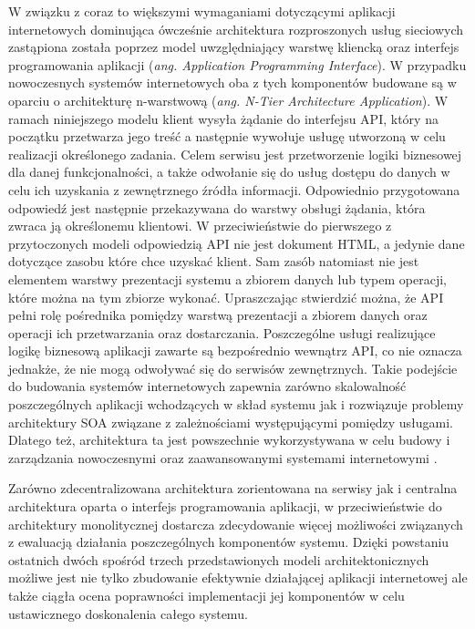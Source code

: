 W związku z coraz to większymi wymaganiami dotyczącymi aplikacji internetowych dominująca ówcześnie architektura rozproszonych usług sieciowych zastąpiona została poprzez model uwzględniający warstwę kliencką oraz interfejs programowania aplikacji (\textit{ang. Application Programming Interface}). W przypadku nowoczesnych systemów internetowych oba z tych komponentów budowane są w oparciu o architekturę n-warstwową (\textit{ang. N-Tier Architecture Application}). W ramach niniejszego modelu klient wysyła żądanie do interfejsu API, który na początku przetwarza jego treść a następnie wywołuje usługę utworzoną w celu realizacji określonego zadania. Celem serwisu jest przetworzenie logiki biznesowej dla danej funkcjonalności, a także odwołanie się do usług dostępu do danych w celu ich uzyskania z zewnętrznego źródła informacji. Odpowiednio przygotowana odpowiedź jest następnie przekazywana do warstwy obsługi żądania, która zwraca ją określonemu klientowi. W przeciwieństwie do pierwszego z przytoczonych modeli odpowiedzią API nie jest dokument HTML, a jedynie dane dotyczące zasobu które chce uzyskać klient. Sam zasób natomiast nie jest elementem warstwy prezentacji systemu a zbiorem danych lub typem operacji, które można na tym zbiorze wykonać. Upraszczając stwierdzić można, że API pełni rolę pośrednika pomiędzy warstwą prezentacji a zbiorem danych oraz operacji ich przetwarzania oraz dostarczania. Poszczególne usługi realizujące logikę biznesową aplikacji zawarte są bezpośrednio wewnątrz API, co nie oznacza jednakże, że nie mogą odwoływać się do serwisów zewnętrznych. Takie podejście do budowania systemów internetowych zapewnia zarówno skalowalność poszczególnych aplikacji wchodzących w skład systemu jak i rozwiązuje problemy architektury SOA związane z zależnościami występującymi pomiędzy usługami. Dlatego też, architektura ta jest powszechnie wykorzystywana w celu budowy i zarządzania nowoczesnymi oraz zaawansowanymi systemami internetowymi \cite{SHENG2014218}.

Zarówno zdecentralizowana architektura zorientowana na serwisy jak i centralna architektura oparta o interfejs programowania aplikacji, w przeciwieństwie do architektury monolitycznej dostarcza zdecydowanie więcej możliwości związanych z ewaluacją działania poszczególnych komponentów systemu. Dzięki powstaniu ostatnich dwóch spośród trzech przedstawionych modeli architektonicznych możliwe jest nie tylko zbudowanie efektywnie działającej aplikacji internetowej ale także ciągła ocena poprawności implementacji jej komponentów w celu ustawicznego doskonalenia całego systemu.

